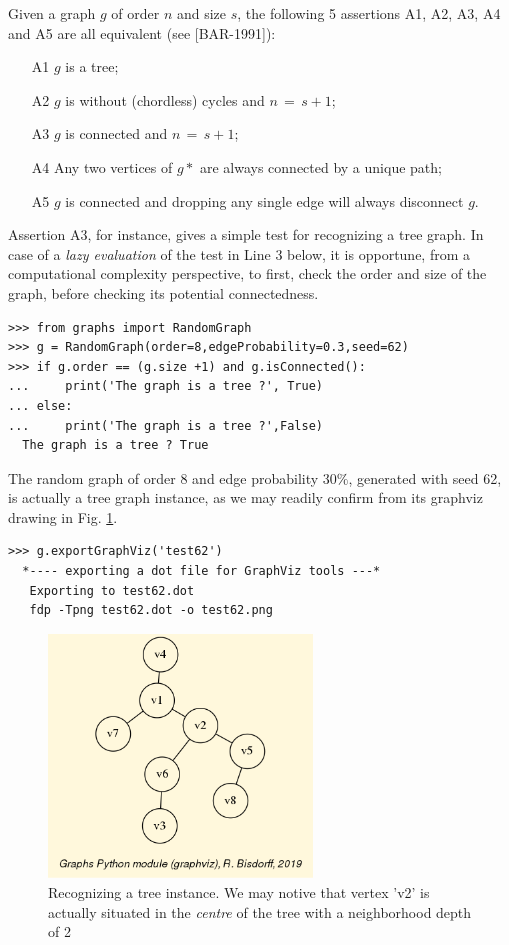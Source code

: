 Given a graph $g$ of order $n$ and size $s$, the following 5 assertions A1, A2, A3, A4 and A5 are all equivalent (see [BAR-1991]):
\begin{itemize}
\item [A1] $g$ is a tree;
\item [A2] $g$ is without (chordless) cycles and $n \,=\, s + 1$;
\item [A3] $g$ is connected and $n \,=\, s + 1$;
\item [A4] Any two vertices of $g*$ are always connected by a unique path;
\item [A5] $g$ is connected and dropping any single edge will always disconnect $g$.
\end{itemize}
Assertion A3, for instance, gives a simple test for recognizing a tree graph. In case of a \emph{lazy evaluation} of the test in Line 3 below, it is opportune, from a computational complexity perspective, to first, check the order and size of the graph, before checking its potential connectedness.
\begin{lstlisting}
>>> from graphs import RandomGraph
>>> g = RandomGraph(order=8,edgeProbability=0.3,seed=62)
>>> if g.order == (g.size +1) and g.isConnected():
...     print('The graph is a tree ?', True)
... else:
...     print('The graph is a tree ?',False)   
  The graph is a tree ? True
\end{lstlisting}
The random graph of order 8 and edge probability $30\%$, generated with seed 62, is actually a tree graph instance, as we may readily confirm from its graphviz drawing in Fig. \ref{fig:23.3}.
\begin{lstlisting}
>>> g.exportGraphViz('test62')
  *---- exporting a dot file for GraphViz tools ---*
   Exporting to test62.dot
   fdp -Tpng test62.dot -o test62.png
\end{lstlisting}
\begin{figure}[h]
\sidecaption
\includegraphics[width=7cm]{Figures/test62.png}
\caption{Recognizing a tree instance. We may notive that vertex 'v2' is actually situated in the \emph{centre} of the tree with a neighborhood depth of 2} 
\label{fig:23.3}       %
\end{figure}

